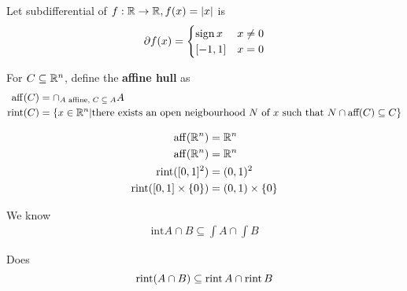 \begin{exmp}
  \label{defn:cones_and_generalized_inequalities:4}
  Let subdifferential of $f: \mathbb{R} \rightarrow \mathbb{R}, f(x) = |x|$ is
  \begin{equation}
    \label{eq:40}
    \partial f(x) = \begin{cases}
      \operatorname*{sign} x & x \neq 0 \\
      [-1, 1] & x = 0
    \end{cases}
  \end{equation}
\end{exmp}


\begin{defn}
  \label{defn:cones_and_generalized_inequalities:5}
  For $C \subseteq \mathbb{R}^{n}$, define the \textbf{affine hull} as
  \begin{align}
    \operatorname*{aff}(C) &= \cap_{\text{$A$ affine, $C \subseteq A$}} A \\
    \operatorname*{rint}(C) &= \{ x \in \mathbb{R}^{n} | \text{there exists an open
      neigbourhood $N$ of $x$ such that $N \cap \text{aff}(C)
      \subseteq C$} \}
  \end{align}
\end{defn}

\begin{exmp}
  \label{defn:cones_and_generalized_inequalities:6}
  \begin{align}
    \label{eq:42}
    \operatorname*{aff}(\mathbb{R}^{n}) &= \mathbb{R}^{n} \\
    \operatorname*{aff}(\mathbb{R}^{n}) &= \mathbb{R}^{n} \\
    \operatorname*{rint}([0, 1]^{2}) &= (0, 1)^{2} \\
    \operatorname*{rint}([0, 1] \times \{ 0 \}) &= (0, 1) \times \{ 0 \}
  \end{align}
\end{exmp}

\begin{exer}
  We know \begin{align}
    \label{eq:32}
    \text{int} A \cap B \subseteq \int A \cap \int B
  \end{align}

  Does
  \begin{equation}
    \label{eq:41}
    \operatorname*{rint}(A \cap B) \subseteq \operatorname*{rint} A \cap \operatorname*{rint} B
  \end{equation}

\end{exer}

